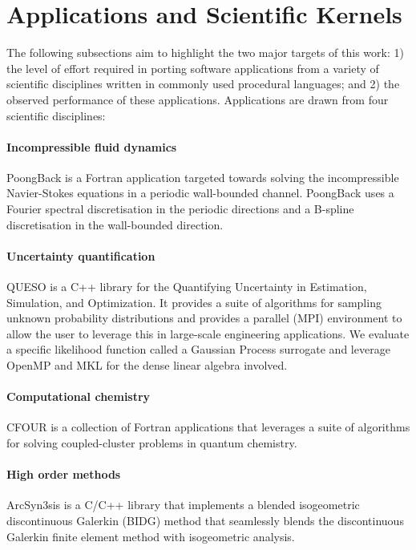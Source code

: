 \section{Applications and Scientific Kernels}
\label{sec:apps}

The following subsections aim to highlight the two major targets of this work: 1) the level of effort
required in porting software applications from a variety of scientific
disciplines written in commonly used procedural languages; and 2) the observed
performance of these applications.  Applications are drawn from four 
scientific disciplines:

\paragraph{Incompressible fluid dynamics}  PoongBack is a Fortran application
targeted towards solving the incompressible Navier-Stokes equations in a
periodic wall-bounded channel.  PoongBack uses a Fourier spectral
discretisation in the periodic directions and a B-spline discretisation in the
wall-bounded direction.

\paragraph{Uncertainty quantification}  QUESO is a C++ library for the
Quantifying Uncertainty in Estimation, Simulation, and Optimization.  It
provides a suite of algorithms for sampling unknown probability distributions
and provides a parallel (MPI) environment to allow the user to leverage this in
large-scale engineering applications.  We evaluate a specific likelihood
function called a Gaussian Process surrogate and leverage OpenMP and MKL for
the dense linear algebra involved.

\paragraph{Computational chemistry}  CFOUR is a collection of Fortran
applications that leverages a suite of algorithms for solving coupled-cluster
problems in quantum chemistry.

\paragraph{High order methods}  ArcSyn3sis is a C/C++ library that implements
a blended isogeometric discontinuous Galerkin (BIDG) method that seamlessly
blends the discontinuous Galerkin finite element method with isogeometric analysis.

